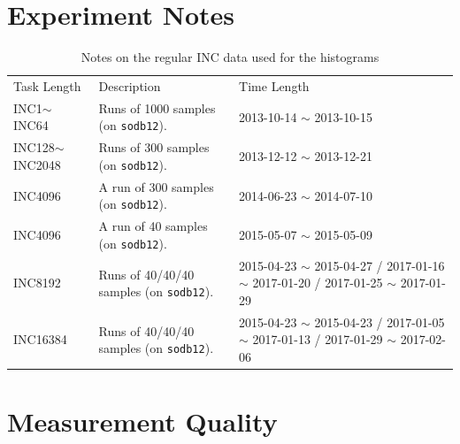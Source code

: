 \documentclass[10pt]{article}
\begin{document}
\section{Experiment Notes}
\begin{table}[h]
\begin{center}
\begin{tabular}{|p{3cm}||p{9cm}|p{4cm}|} \hline
Task Length & Description & Time Length\\ \cline{1-3}
INC1$\sim$INC64 & Runs of 1000 samples (on {\tt sodb12}). & 2013-10-14 $\sim$ 2013-10-15\\ \hline
INC128$\sim$INC2048 & Runs of 300 samples (on {\tt sodb12}). & 2013-12-12 $\sim$ 2013-12-21\\ \hline 
INC4096 & A run of 300 samples (on {\tt sodb12}). & 2014-06-23 $\sim$ 2014-07-10 \\ \hline 
INC4096 & A run of 40 samples (on {\tt sodb12}). & 2015-05-07 $\sim$ 2015-05-09  \\ \hline 
INC8192 & Runs of 40/40/40 samples (on {\tt sodb12}). & 2015-04-23 $\sim$ 2015-04-27 / 2017-01-16 $\sim$ 2017-01-20 / 2017-01-25 $\sim$ 2017-01-29\\ \hline
INC16384 & Runs of 40/40/40 samples (on {\tt sodb12}). & 2015-04-23 $\sim$ 2015-04-23 / 2017-01-05 $\sim$ 2017-01-13 / 2017-01-29 $\sim$ 2017-02-06\\ \hline 
\end{tabular}
\end{center}
\vspace{-.2in}
\caption{Notes on the regular INC data used for the histograms\label{tab:exp_notes1}}
\end{table}


\section{Measurement Quality~\label{sec:meq}}
\end{document}
